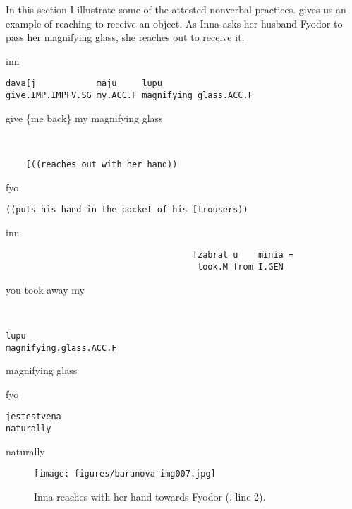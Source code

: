 \documentclass[output=paper,modfonts,nonflat]{langsci/langscibook}
\begin{document}
In this section I illustrate some of the attested nonverbal practices.  gives us an example of reaching to receive an object. As Inna asks her husband Fyodor to pass her magnifying glass, she reaches out to receive it.

\vspace{-1mm}
%
\begin{mdframednoverticalspace}[style=firstfoc]
%
\begin{transbox}{1}{inn}
\begin{verbatim}
dava[j            maju     lupu
give.IMP.IMPFV.SG my.ACC.F magnifying glass.ACC.F
\end{verbatim}
give \{me back\} my magnifying glass
\end{transbox}
\end{mdframednoverticalspace}
%
\begin{transbox}{2}{~}
\begin{verbatim}
    [((reaches out with her hand))
\end{verbatim}
\end{transbox}
%
%
\begin{transbox}{4}{fyo}
\begin{verbatim}
((puts his hand in the pocket of his [trousers))
\end{verbatim}
\end{transbox}
%
\begin{transbox}{5}{inn}
\begin{verbatim}
                                     [zabral u    minia =
                                      took.M from I.GEN
\end{verbatim}
\hspace{5.6cm} you took away my
\end{transbox}
%
\begin{transbox}{6}{~}
\begin{verbatim}
lupu
magnifying.glass.ACC.F
\end{verbatim}
magnifying glass
\end{transbox}
%
%
\begin{transbox}{8}{fyo}
\begin{verbatim}
jestestvena
naturally
\end{verbatim}
naturally
\end{transbox}
%
%
\bigskip
%
\begin{figure}
\caption{Inna reaches with her hand towards Fyodor (, line 2).}
\label{fig:baranova:7}
\texttt{[image: figures/baranova-img007.jpg]}
\end{figure}
\end{document}

